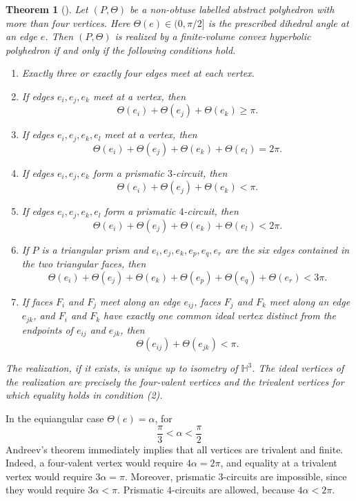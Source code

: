 \documentclass[12pt,a4paper]{article}
\newtheorem{theorem}{Theorem}[section]
\theoremstyle{definition}
\newcommand{\HH}{\mathbb H}
\begin{document}
\begin{theorem}[{\cite[Theorem~3]{Atkinson2011}}]\label{thm:andreev}
Let \((P,\Theta)\) be a non-obtuse labelled abstract polyhedron with more than four vertices. Here \(\Theta(e)\in(0,\pi/2]\) is the prescribed dihedral angle at an edge \(e\). Then \((P,\Theta)\) is realized by a finite-volume convex hyperbolic polyhedron if and only if the following conditions hold.
\begin{enumerate}[label=\textup{(\arabic*)},itemsep=0.15em,topsep=0.3em]
    \item Exactly three or exactly four edges meet at each vertex.
    \item If edges \(e_i,e_j,e_k\) meet at a vertex, then
    \[
        \Theta(e_i)+\Theta(e_j)+\Theta(e_k)\ge \pi .
    \]
    \item If edges \(e_i,e_j,e_k,e_l\) meet at a vertex, then
    \[
        \Theta(e_i)+\Theta(e_j)+\Theta(e_k)+\Theta(e_l)=2\pi .
    \]
    \item If edges \(e_i,e_j,e_k\) form a prismatic \(3\)-circuit, then
    \[
        \Theta(e_i)+\Theta(e_j)+\Theta(e_k)<\pi .
    \]
    \item If edges \(e_i,e_j,e_k,e_l\) form a prismatic \(4\)-circuit, then
    \[
        \Theta(e_i)+\Theta(e_j)+\Theta(e_k)+\Theta(e_l)<2\pi .
    \]
    \item If \(P\) is a triangular prism and \(e_i,e_j,e_k,e_p,e_q,e_r\) are the six edges contained in the two triangular faces, then
    \[
        \Theta(e_i)+\Theta(e_j)+\Theta(e_k)+\Theta(e_p)+\Theta(e_q)+\Theta(e_r)<3\pi .
    \]
    \item If faces \(F_i\) and \(F_j\) meet along an edge \(e_{ij}\), faces \(F_j\) and \(F_k\) meet along an edge \(e_{jk}\), and \(F_i\) and \(F_k\) have exactly one common ideal vertex distinct from the endpoints of \(e_{ij}\) and \(e_{jk}\), then
    \[
        \Theta(e_{ij})+\Theta(e_{jk})<\pi .
    \]
\end{enumerate}
The realization, if it exists, is unique up to isometry of \(\HH^3\). The ideal vertices of the realization are precisely the four-valent vertices and the trivalent vertices for which equality holds in condition \textup{(2)}.
\end{theorem}

In the equiangular case \(\Theta(e)=\alpha\), for
\[
        \frac{\pi}{3}<\alpha<\frac{\pi}{2}
\]
Andreev's theorem immediately implies that all vertices are trivalent and finite. Indeed, a four-valent vertex would require \(4\alpha=2\pi\), and equality at a trivalent vertex would require \(3\alpha=\pi\). Moreover, prismatic \(3\)-circuits are impossible, since they would require \(3\alpha<\pi\). Prismatic \(4\)-circuits are allowed, because \(4\alpha<2\pi\).
\end{document}
